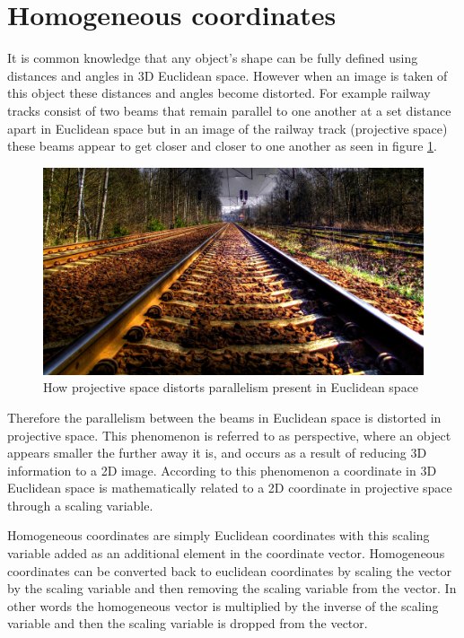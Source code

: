 \documentclass[12pt,oneside,openany,a4paper, %
english, %
masters-t, goldenblock]{usthesis}
\begin{document}

\section{Homogeneous coordinates}
It is common knowledge that any object's shape can be fully defined using distances and angles in 3D Euclidean space. However when an image is taken of this object these distances and angles become distorted. For example railway tracks consist of two beams that remain parallel to one another at a set distance apart in Euclidean space but in an image of the railway track (projective space) these beams appear to get closer and closer to one another as seen in figure \ref{fig:traintrack}. %

\begin{figure}[H]
    \centering
    \includegraphics[scale=0.1]{TrainTrack}
    \caption{How projective space distorts parallelism present in Euclidean space}
    \label{fig:traintrack}
\end{figure}

Therefore the parallelism between the beams in Euclidean space is distorted in projective space. This phenomenon is referred to as perspective, where an object appears smaller the further away it is, and occurs as a result of reducing 3D information to a 2D image. According to this phenomenon a coordinate in 3D Euclidean space is mathematically related to a 2D coordinate in projective space through a scaling variable.

Homogeneous coordinates are simply Euclidean coordinates with this scaling variable added as an additional element in the coordinate vector. Homogeneous coordinates can be converted back to euclidean coordinates by scaling the vector by the scaling variable and then removing the scaling variable from the vector. In other words the homogeneous vector is multiplied by the inverse of the scaling variable and then the scaling variable is dropped from the vector.
\end{document}

